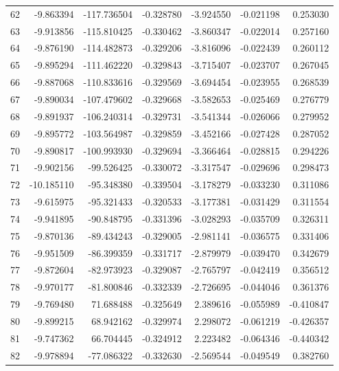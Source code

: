 \begin{tabular}{rrrrrrr}
 62 &  -9.863394 & -117.736504 & -0.328780 &   -3.924550 &   -0.021198 &  0.253030 \\
 63 &  -9.913856 & -115.810425 & -0.330462 &   -3.860347 &   -0.022014 &  0.257160 \\
 64 &  -9.876190 & -114.482873 & -0.329206 &   -3.816096 &   -0.022439 &  0.260112 \\
 65 &  -9.895294 & -111.462220 & -0.329843 &   -3.715407 &   -0.023707 &  0.267045 \\
 66 &  -9.887068 & -110.833616 & -0.329569 &   -3.694454 &   -0.023955 &  0.268539 \\
 67 &  -9.890034 & -107.479602 & -0.329668 &   -3.582653 &   -0.025469 &  0.276779 \\
 68 &  -9.891937 & -106.240314 & -0.329731 &   -3.541344 &   -0.026066 &  0.279952 \\
 69 &  -9.895772 & -103.564987 & -0.329859 &   -3.452166 &   -0.027428 &  0.287052 \\
 70 &  -9.890817 & -100.993930 & -0.329694 &   -3.366464 &   -0.028815 &  0.294226 \\
 71 &  -9.902156 &  -99.526425 & -0.330072 &   -3.317547 &   -0.029696 &  0.298473 \\
 72 & -10.185110 &  -95.348380 & -0.339504 &   -3.178279 &   -0.033230 &  0.311086 \\
 73 &  -9.615975 &  -95.321433 & -0.320533 &   -3.177381 &   -0.031429 &  0.311554 \\
 74 &  -9.941895 &  -90.848795 & -0.331396 &   -3.028293 &   -0.035709 &  0.326311 \\
 75 &  -9.870136 &  -89.434243 & -0.329005 &   -2.981141 &   -0.036575 &  0.331406 \\
 76 &  -9.951509 &  -86.399359 & -0.331717 &   -2.879979 &   -0.039470 &  0.342679 \\
 77 &  -9.872604 &  -82.973923 & -0.329087 &   -2.765797 &   -0.042419 &  0.356512 \\
 78 &  -9.970177 &  -81.800846 & -0.332339 &   -2.726695 &   -0.044046 &  0.361376 \\
 79 &  -9.769480 &   71.688488 & -0.325649 &    2.389616 &   -0.055989 & -0.410847 \\
 80 &  -9.899215 &   68.942162 & -0.329974 &    2.298072 &   -0.061219 & -0.426357 \\
 81 &  -9.747362 &   66.704445 & -0.324912 &    2.223482 &   -0.064346 & -0.440342 \\
 82 &  -9.978894 &  -77.086322 & -0.332630 &   -2.569544 &   -0.049549 &  0.382760 \\

\end{tabular}
